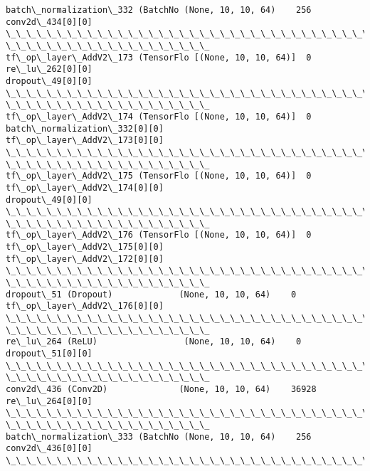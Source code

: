 \documentclass[11pt]{article}
\begin{document}
\begin{Verbatim}[commandchars=\\\{\}]
batch\_normalization\_332 (BatchNo (None, 10, 10, 64)    256
conv2d\_434[0][0]
\_\_\_\_\_\_\_\_\_\_\_\_\_\_\_\_\_\_\_\_\_\_\_\_\_\_\_\_\_\_\_\_\_\_\_\_\_\_\_\_\_\_\_\_\_\_\_\_\_\_\_\_\_\_\_\_\_\_\_\_\_\_\_\_\_\_\_\_\_\_\_\_\_\_\_\_\_\_\_\_
\_\_\_\_\_\_\_\_\_\_\_\_\_\_\_\_\_\_\_\_
tf\_op\_layer\_AddV2\_173 (TensorFlo [(None, 10, 10, 64)]  0
re\_lu\_262[0][0]
dropout\_49[0][0]
\_\_\_\_\_\_\_\_\_\_\_\_\_\_\_\_\_\_\_\_\_\_\_\_\_\_\_\_\_\_\_\_\_\_\_\_\_\_\_\_\_\_\_\_\_\_\_\_\_\_\_\_\_\_\_\_\_\_\_\_\_\_\_\_\_\_\_\_\_\_\_\_\_\_\_\_\_\_\_\_
\_\_\_\_\_\_\_\_\_\_\_\_\_\_\_\_\_\_\_\_
tf\_op\_layer\_AddV2\_174 (TensorFlo [(None, 10, 10, 64)]  0
batch\_normalization\_332[0][0]
tf\_op\_layer\_AddV2\_173[0][0]
\_\_\_\_\_\_\_\_\_\_\_\_\_\_\_\_\_\_\_\_\_\_\_\_\_\_\_\_\_\_\_\_\_\_\_\_\_\_\_\_\_\_\_\_\_\_\_\_\_\_\_\_\_\_\_\_\_\_\_\_\_\_\_\_\_\_\_\_\_\_\_\_\_\_\_\_\_\_\_\_
\_\_\_\_\_\_\_\_\_\_\_\_\_\_\_\_\_\_\_\_
tf\_op\_layer\_AddV2\_175 (TensorFlo [(None, 10, 10, 64)]  0
tf\_op\_layer\_AddV2\_174[0][0]
dropout\_49[0][0]
\_\_\_\_\_\_\_\_\_\_\_\_\_\_\_\_\_\_\_\_\_\_\_\_\_\_\_\_\_\_\_\_\_\_\_\_\_\_\_\_\_\_\_\_\_\_\_\_\_\_\_\_\_\_\_\_\_\_\_\_\_\_\_\_\_\_\_\_\_\_\_\_\_\_\_\_\_\_\_\_
\_\_\_\_\_\_\_\_\_\_\_\_\_\_\_\_\_\_\_\_
tf\_op\_layer\_AddV2\_176 (TensorFlo [(None, 10, 10, 64)]  0
tf\_op\_layer\_AddV2\_175[0][0]
tf\_op\_layer\_AddV2\_172[0][0]
\_\_\_\_\_\_\_\_\_\_\_\_\_\_\_\_\_\_\_\_\_\_\_\_\_\_\_\_\_\_\_\_\_\_\_\_\_\_\_\_\_\_\_\_\_\_\_\_\_\_\_\_\_\_\_\_\_\_\_\_\_\_\_\_\_\_\_\_\_\_\_\_\_\_\_\_\_\_\_\_
\_\_\_\_\_\_\_\_\_\_\_\_\_\_\_\_\_\_\_\_
dropout\_51 (Dropout)             (None, 10, 10, 64)    0
tf\_op\_layer\_AddV2\_176[0][0]
\_\_\_\_\_\_\_\_\_\_\_\_\_\_\_\_\_\_\_\_\_\_\_\_\_\_\_\_\_\_\_\_\_\_\_\_\_\_\_\_\_\_\_\_\_\_\_\_\_\_\_\_\_\_\_\_\_\_\_\_\_\_\_\_\_\_\_\_\_\_\_\_\_\_\_\_\_\_\_\_
\_\_\_\_\_\_\_\_\_\_\_\_\_\_\_\_\_\_\_\_
re\_lu\_264 (ReLU)                 (None, 10, 10, 64)    0
dropout\_51[0][0]
\_\_\_\_\_\_\_\_\_\_\_\_\_\_\_\_\_\_\_\_\_\_\_\_\_\_\_\_\_\_\_\_\_\_\_\_\_\_\_\_\_\_\_\_\_\_\_\_\_\_\_\_\_\_\_\_\_\_\_\_\_\_\_\_\_\_\_\_\_\_\_\_\_\_\_\_\_\_\_\_
\_\_\_\_\_\_\_\_\_\_\_\_\_\_\_\_\_\_\_\_
conv2d\_436 (Conv2D)              (None, 10, 10, 64)    36928
re\_lu\_264[0][0]
\_\_\_\_\_\_\_\_\_\_\_\_\_\_\_\_\_\_\_\_\_\_\_\_\_\_\_\_\_\_\_\_\_\_\_\_\_\_\_\_\_\_\_\_\_\_\_\_\_\_\_\_\_\_\_\_\_\_\_\_\_\_\_\_\_\_\_\_\_\_\_\_\_\_\_\_\_\_\_\_
\_\_\_\_\_\_\_\_\_\_\_\_\_\_\_\_\_\_\_\_
batch\_normalization\_333 (BatchNo (None, 10, 10, 64)    256
conv2d\_436[0][0]
\_\_\_\_\_\_\_\_\_\_\_\_\_\_\_\_\_\_\_\_\_\_\_\_\_\_\_\_\_\_\_\_\_\_\_\_\_\_\_\_\_\_\_\_\_\_\_\_\_\_\_\_\_\_\_\_\_\_\_\_\_\_\_\_\_\_\_\_\_\_\_\_\_\_\_\_\_\_\_\_

\end{Verbatim}
\end{document}
